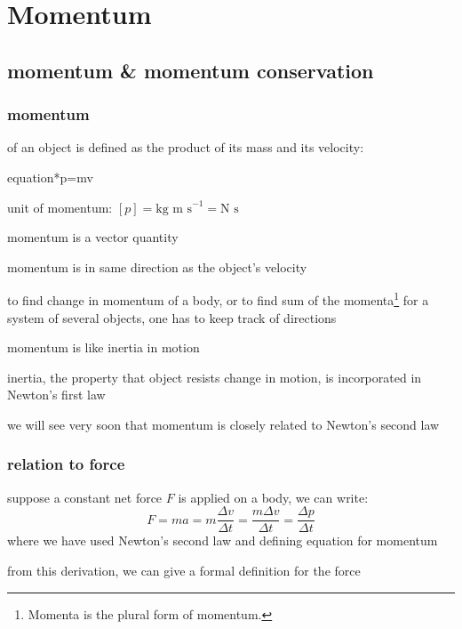 \chapter{Momentum}

\section{momentum \& momentum conservation}

\subsection{momentum}

\begin{ilight}
	\centering {} of an object is defined as the product of its mass and its velocity: \begin{empheq}[box=\tcbhighmath]{equation*}{p=mv}\end{empheq} 
\end{ilight}

\cmt unit of momentum: $[p]=\text{kg m s}^{-1} = \text{N s}$

\cmt momentum is a vector quantity

momentum is in same direction as the object's velocity

to find change in momentum of a body, or to find sum of the momenta\footnote{Momenta is the plural form of momentum.} for a system of several objects, one has to keep track of directions

\cmt momentum is like inertia in motion

inertia, the property that object resists change in motion, is incorporated in Newton's first law

we will see very soon that momentum is closely related to Newton's second law

\subsection{relation to force}

suppose a constant net force $F$ is applied on a body, we can write:
\begin{equation*}
	F = ma = m\frac{\Delta v}{\Delta t} = \frac{m\Delta v}{\Delta t} = \frac{\Delta p}{\Delta t}
\end{equation*}
where we have used Newton's second law and defining equation for momentum

from this derivation, we can give a formal definition for the force

